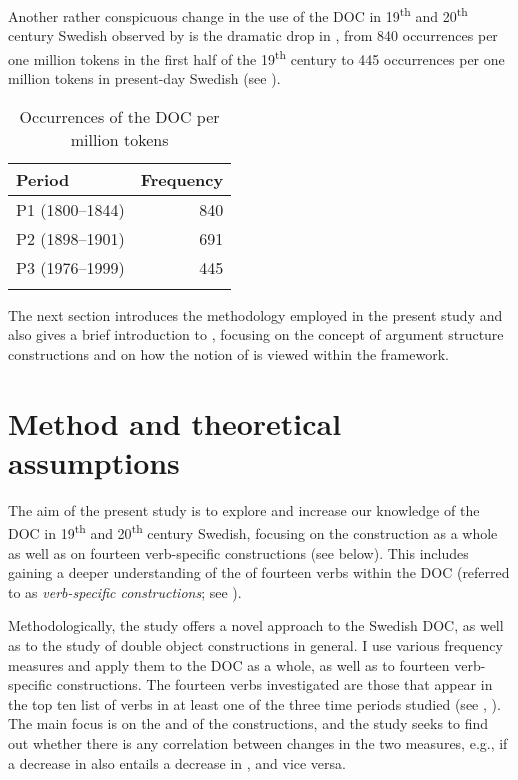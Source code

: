 \documentclass[output=paper]{langscibook}
\begin{document}
Another rather conspicuous change in the use of the DOC in 19\textsuperscript{th} and 20\textsuperscript{th} century Swedish observed by \textcite{ValdesonSubmitted} is the dramatic drop in , from 840 occurrences per one million tokens in the first half of the 19\textsuperscript{th} century to 445 occurrences per one million tokens in present-day Swedish (see ).


\begin{table}
\caption{Occurrences of the DOC per million tokens \parencite{ValdesonSubmitted}\label{tab:valdeson:1}}
\begin{tabular}{lr}
\lsptoprule
Period & Frequency\\
\midrule
P1 (1800–1844) & 840\\
P2 (1898–1901) & 691\\
P3 (1976–1999) & 445\\
\lspbottomrule
\end{tabular}
\end{table}

The next section introduces the methodology employed in the present study and also gives a brief introduction to , focusing on the concept of argument structure constructions and on how the notion of  is viewed within the framework. 


\section{Method and theoretical assumptions}\label{sec:valdeson:3}


The aim of the present study is to explore and increase our knowledge of the DOC in 19\textsuperscript{th} and 20\textsuperscript{th} century Swedish, focusing on the construction as a whole as well as on fourteen verb-specific constructions (see below). This includes gaining a deeper understanding of the  of fourteen verbs within the DOC (referred to as \textit{verb-specific constructions}; see ).



Methodologically, the study offers a novel approach to the Swedish DOC, as well as to the study of double object constructions in general. I use various frequency measures and apply them to the DOC as a whole, as well as to fourteen verb-specific constructions. The fourteen verbs investigated are those that appear in the top ten list of  verbs in at least one of the three time periods studied (see , ). The main focus is on the  and  of the constructions, and the study seeks to find out whether there is any correlation between changes in the two measures, e.g., if a decrease in  also entails a decrease in , and vice versa.
\end{document}
